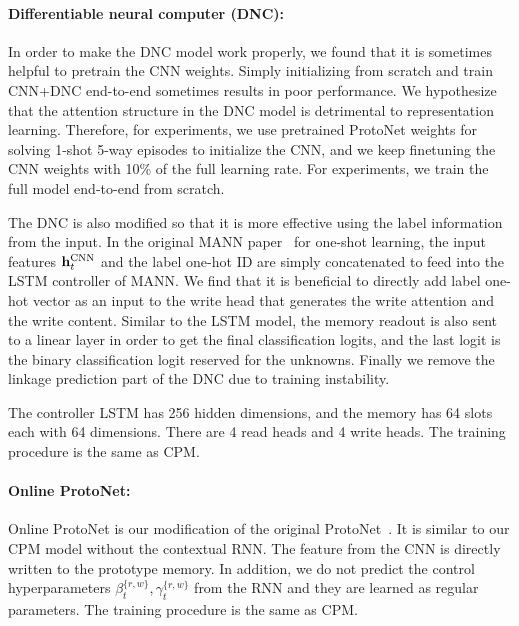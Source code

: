 \paragraph{Differentiable neural computer (DNC):} In order to make the DNC model work properly, we
found that it is sometimes helpful to pretrain the CNN weights. Simply initializing from scratch and
train CNN+DNC end-to-end sometimes results in poor performance. We hypothesize that the attention
structure in the DNC model is detrimental to representation learning. Therefore, for \ourchar{}
experiments, we use pretrained ProtoNet weights for solving 1-shot 5-way episodes to initialize the
CNN, and we keep finetuning the CNN weights with 10\% of the full learning rate. For \ourroom{}
experiments, we train the full model end-to-end from scratch.

The DNC is also modified so that it is more effective using the label information from the input. In
the original MANN paper~\citep{mann} for one-shot learning, the input features $\mathbf{h}_t^{\text{CNN}}$
and the label one-hot ID are simply concatenated to feed into the LSTM controller of MANN. We find
that it is beneficial to directly add label one-hot vector as an input to the write head that
generates the write attention and the write content.  Similar to the LSTM model, the memory readout is also sent to a
linear layer in order to get the final classification logits, and the last logit is the binary
classification logit reserved for the unknowns. Finally we remove the linkage prediction part of the DNC
due to training instability.

The controller LSTM has 256 hidden dimensions, and the memory has 64 slots each with 64 dimensions.
There are 4 read heads and 4 write heads. The training procedure is the same as CPM.

\paragraph{Online ProtoNet:} Online ProtoNet is our modification of the original
ProtoNet~\citep{protonet}. It is similar to our CPM model without the contextual RNN. The feature
from the CNN is directly written to the prototype memory. In addition, we do not predict the control
hyperparameters $\beta^{\{r,w\}}_t,\gamma^{\{r,w\}}_t$ from the RNN and they are learned as regular parameters. The training procedure is the same as CPM.

